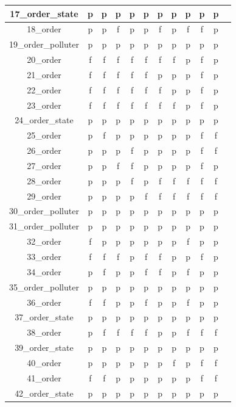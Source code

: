 \documentclass[
fancyheadings, %
%
%
]{stsreprt}
\begin{document}
\begin{longtable}{|c|c|c|c|c|c|c|c|c|c|c|c|}
\hline
17\_order\_state & p & p & p & p & p & p & p & p & p & p \\
\hline
18\_order & p & p & f & p & p & f & p & f & f & p \\
\hline
19\_order\_polluter & p & p & p & p & p & p & p & p & p & p \\
\hline
20\_order & f & f & f & f & f & f & f & p & f & p \\
\hline
21\_order & f & f & f & f & f & p & p & p & f & p \\
\hline
22\_order & f & f & f & f & f & f & p & p & f & p \\
\hline
23\_order & f & f & f & f & f & f & f & p & f & p \\
\hline
24\_order\_state & p & p & p & p & p & p & p & p & p & p \\
\hline
25\_order & p & f & p & p & p & p & p & p & f & f \\
\hline
26\_order & p & p & p & f & p & p & p & p & f & f \\
\hline
27\_order & p & p & f & f & p & p & p & p & f & p \\
\hline
28\_order & p & p & p & f & p & f & f & f & f & f \\
\hline
29\_order & p & p & p & p & f & f & f & f & f & f \\
\hline
30\_order\_polluter & p & p & p & p & p & p & p & p & p & p \\
\hline
31\_order\_polluter & p & p & p & p & p & p & p & p & p & p \\
\hline
32\_order & f & p & p & p & p & p & p & f & p & p \\
\hline
33\_order & f & f & f & p & f & f & p & p & f & p \\
\hline
34\_order & p & f & p & p & f & f & p & f & p & p \\
\hline
35\_order\_polluter & p & p & p & p & p & p & p & p & p & p \\
\hline
36\_order & f & f & p & p & f & p & p & f & p & p \\
\hline
37\_order\_state & p & p & p & p & p & p & p & p & p & p \\
\hline
38\_order & p & f & f & f & f & p & p & f & f & f \\
\hline
39\_order\_state & p & p & p & p & p & p & p & p & p & p \\
\hline
40\_order & p & p & p & p & p & p & f & p & f & f \\
\hline
41\_order & f & f & p & p & p & p & p & p & f & f \\
\hline
42\_order\_state & p & p & p & p & p & p & p & p & p & p \\

\end{longtable}
\end{document}
